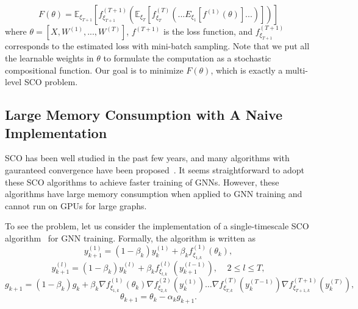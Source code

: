 \begin{equation}
\label{eq:loss}
    F(\theta) = \mathbb{E}_{\xi_{T+1}}\left[ f_{\xi_{T+1}}^{(T+1)}\left( \mathbb{E}_{\xi_{T}}\left[f_{\xi_{T}}^{(T)}\left(...{E}_{\xi_1}[f^{(1)}(\theta)]...\right)\right] \right) \right]
\end{equation}
where $\theta=[X, W^{(1)}, ..., W^{(T)}]$, $f^{(T+1)}$ is the loss function, and $f_{\xi_{T+1}}^{(T+1)}$ corresponds to the estimated loss with mini-batch sampling. 
Note that we put all the learnable weights in $\theta$ to formulate the computation as a stochastic compositional function. 
Our goal is to minimize $F(\theta)$, which is exactly a multi-level SCO problem.  



\subsection{Large Memory Consumption with A Naive Implementation}
SCO has been well studied in the past few years, and many algorithms with gauranteed convergence have been proposed~\cite{zhang2019multi, yang2019multilevel,  chen2020solving, yang2019multilevel, balasubramanian2020stochastic, chen2020solving, lian2017finite, wang2017accelerating, ghadimi2020single}. 
It seems straightforward to adopt these SCO algorithms to achieve faster training of GNNs. 
However, these algorithms have large memory consumption when applied to GNN training and cannot run on GPUs for large graphs.  

To see the problem, let us consider the implementation of a single-timescale SCO algorithm~\cite{balasubramanian2020stochastic} for GNN training. 
Formally, the algorithm is written as 
\begin{equation}
  \label{eq:alg_step1}
             y^{(1)}_{k+1} = (1-\beta_{k})y^{(1)}_k + \beta_{k}  f^{(1)}_{\xi_{1,k}}(\theta_{k}),
 \end{equation}
\begin{equation}
         \label{eq:alg_step2}
      y^{(l)}_{k+1} = (1-\beta_{k})y^{(l)}_k + \beta_{k}  f^{(l)}_{\xi_{l,k}}(y^{(l-1)}_{k+1}), \;\;\;\; 2\le l \le T,
 \end{equation}
 \begin{equation}
  \label{eq:alg_step3}
g_{k+1} = (1-\beta_{k})g_{k} + \beta_{k} \nabla f_{\xi_{1,k}}^{(1)}(\theta_k) \nabla f_{\xi_{2,k}}^{(2)}(y^{(1)}_k)\ldots \nabla  f_{\xi_{T,k}}^{(T)}(y^{(T-1)}_k)\nabla f_{\xi_{T+1,k}}^{(T+1)}(y^{(T)}_k),
\end{equation}
 \begin{equation}
  \label{eq:alg_step4}
\theta_{k+1} = \theta_{k} - \alpha_k g_{k+1}.
\end{equation}

